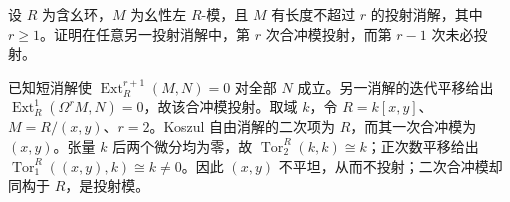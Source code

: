 \begin{exercise}\label{b4:ex:08-truncate-independent}
	设 \(R\) 为含幺环，\(M\) 为幺性左 \(R\)-模，且 \(M\) 有长度不超过 \(r\) 的投射消解，其中 \(r\ge1\)。证明在任意另一投射消解中，第 \(r\) 次合冲模投射，而第 \(r-1\) 次未必投射。
\end{exercise}
\begin{solution}
	已知短消解使 \(\operatorname{Ext}_R^{r+1}(M,N)=0\) 对全部 \(N\) 成立。另一消解的迭代平移给出 \(\operatorname{Ext}_R^1(\Omega^rM,N)=0\)，故该合冲模投射。取域 \(k\)，令 \(R=k[x,y]\)、\(M=R/(x,y)\)、\(r=2\)。Koszul 自由消解的二次项为 \(R\)，而其一次合冲模为 \((x,y)\)。张量 \(k\) 后两个微分均为零，故 \(\operatorname{Tor}_2^R(k,k)\cong k\)；正次数平移给出 \(\operatorname{Tor}_1^R((x,y),k)\cong k\ne0\)。因此 \((x,y)\) 不平坦，从而不投射；二次合冲模却同构于 \(R\)，是投射模。
\end{solution}

